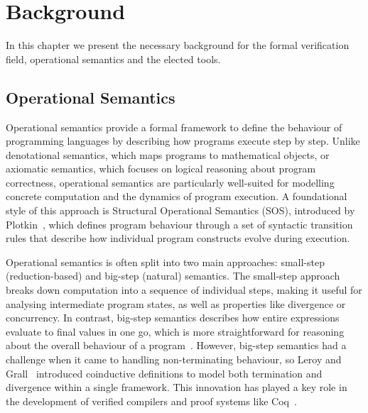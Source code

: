 
%


\chapter{Background}
\label{cha:Background}

In this chapter we present the necessary background for the formal verification field, operational semantics and the elected tools.

\section{Operational Semantics}
\label{sec:Operational_Semantics}

Operational semantics provide a formal framework to define the behaviour of programming languages by describing 
how programs execute step by step. Unlike denotational semantics, which maps programs to mathematical objects, or 
axiomatic semantics, which focuses on logical reasoning about program correctness, operational semantics are particularly 
well-suited for modelling concrete computation and the dynamics of program execution. A foundational style of 
this approach is Structural Operational Semantics (SOS), introduced by Plotkin~\cite{plotkin_81_structural}, which defines program behaviour 
through a set of syntactic transition rules that describe how individual program constructs evolve during execution.

Operational semantics is often split into two main approaches: small-step (reduction-based) and big-step (natural) semantics. 
The small-step approach breaks down computation into a sequence of individual steps, making it useful for analysing intermediate 
program states, as well as properties like divergence or concurrency. In contrast, big-step semantics describes how entire expressions 
evaluate to final values in one go, which is more straightforward for reasoning about the overall behaviour of a 
program~\cite{abs-0808-0586}. However, big-step semantics had a challenge when it came to handling non-terminating behaviour, so 
Leroy and Grall~\cite{abs-0808-0586} introduced coinductive definitions to model both termination and divergence within a single framework. 
This innovation has played a key role in the development of verified compilers and proof systems like Coq~\cite{75277.75285}.


